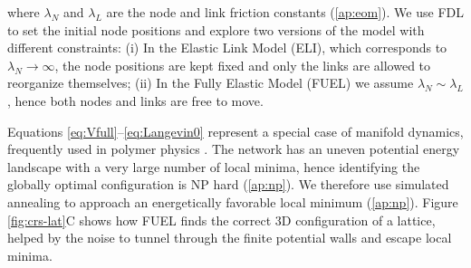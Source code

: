 \documentclass[linenumbers,endfloats,nofootinbib,preprint,floatfix,titlepage,superscriptaddress]{revtex4-1} %
\begin{document}
where $\lambda_N$ and $\lambda_L$ are the node and link friction constants (\ref{ap:eom}). 
We use FDL to set the initial node positions and explore two versions of the model with different constraints: 
(i) In the Elastic Link Model (ELI), which corresponds to $\lambda_N\to \infty$, the node positions are kept fixed and only the links are allowed to reorganize themselves; 
(ii) In the Fully Elastic Model (FUEL) we assume $\lambda_N \sim \lambda_L$, hence both nodes and links are free to move. 

Equations \eqref{eq:Vfull}--\eqref{eq:Langevin0} represent a special case of manifold dynamics, frequently used in polymer physics \cite{mezard1991replica}. 
The network has an uneven potential energy landscape \cite{bouchaud1998out} %
with a very large number of local minima, hence identifying the globally optimal configuration is NP hard (\ref{ap:np}).
We therefore use simulated annealing \cite{kirkpatrick1987optimization} %
to approach an energetically favorable local minimum (\ref{ap:np}). 
Figure \ref{fig:crs-lat}C shows how FUEL finds the correct 3D configuration of a lattice, %
helped by the noise to tunnel through the finite potential walls and escape local minima. 
\end{document}

